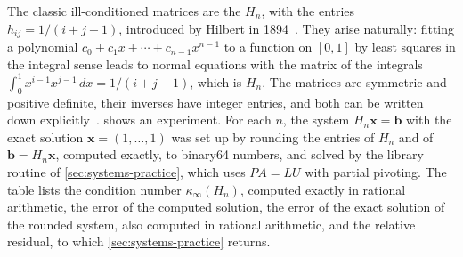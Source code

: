The classic ill-conditioned matrices are the  $H_n$, with the entries $h_{ij}=1/(i+j-1)$, introduced by Hilbert in 1894~\cite{hilbert1894}. They arise naturally: fitting a polynomial $c_0+c_1x+\cdots+c_{n-1}x^{n-1}$ to a function on $[0,1]$ by least squares in the integral sense leads to normal equations with the matrix of the integrals $\int_0^1x^{i-1}x^{j-1}\,dx=1/(i+j-1)$, which is $H_n$. The matrices are symmetric and positive definite, their inverses have integer entries, and both can be written down explicitly~\cite{choi1983}.  shows an experiment. For each $n$, the system $H_n\mathbf x=\mathbf b$ with the exact solution $\mathbf x=(1,\ldots,1)$ was set up by rounding the entries of $H_n$ and of $\mathbf b=H_n\mathbf x$, computed exactly, to binary64 numbers, and solved by the library routine of \cref{sec:systems-practice}, which uses $PA=LU$ with partial pivoting. The table lists the condition number $\kappa_\infty(H_n)$, computed exactly in rational arithmetic, the error of the computed solution, the error of the exact solution of the rounded system, also computed in rational arithmetic, and the relative residual, to which \cref{sec:systems-practice} returns.

\begin{table}
\end{table}

